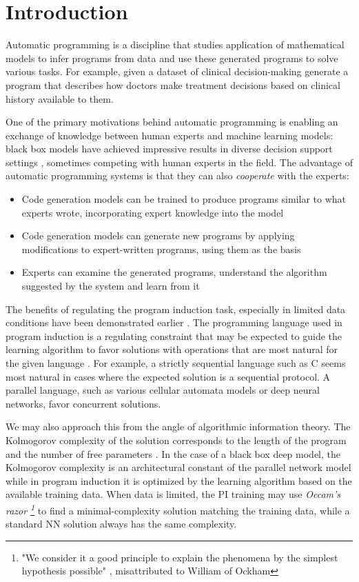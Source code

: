 
\section{Introduction}\label{sec:intro}

Automatic programming is a discipline that studies application of mathematical models to infer programs from data and use these generated programs to solve various tasks.
For example, given a dataset of clinical decision-making generate a program that describes how doctors make treatment decisions based on clinical history available to them.

One of the primary motivations behind automatic programming is enabling an exchange of knowledge between human experts and machine learning models: black box models have achieved impressive results in diverse decision support settings \cite{deeprl}, sometimes competing with human experts in the field. The advantage of automatic programming systems is that they can also \emph{cooperate} with the experts:
\begin{itemize}
    \item Code generation models can be trained to produce programs similar to what experts wrote, incorporating expert knowledge into the model
    \item Code generation models can generate new programs by applying modifications to expert-written programs, using them as the basis
    \item Experts can examine the generated programs, understand the algorithm suggested by the system and learn from it
\end{itemize}

The benefits of regulating the program induction task, especially in limited data conditions have been demonstrated earlier \cite{metainduction}. The programming language used in program induction is a regulating constraint that may be expected to guide the learning algorithm to favor solutions with operations that are most natural for the given language \cite{massiveparallelism}. For example, a strictly sequential language such as C seems most natural in cases where the expected solution is a sequential protocol. A parallel language, such as various cellular automata models or deep neural networks, favor concurrent solutions. 

We may also approach this from the angle of algorithmic information theory. The Kolmogorov complexity of the solution corresponds to the length of the program and the number of free parameters \cite{kolmogorov}. In the case of a black box deep model, the Kolmogorov complexity is an architectural constant of the parallel network model while in program induction it is optimized by the learning algorithm based on the available training data. When data is limited, the PI training may use {\sl Occam's razor  \footnote{"We consider it a good principle to explain the phenomena by the simplest hypothesis possible" \cite[book 3, chapter 2]{ptolemy}, misattributed \cite{occam} to William of Ockham }} to find a minimal-complexity solution matching the training data, while a standard NN solution always has the same complexity. 

